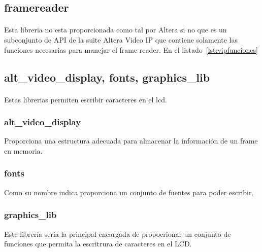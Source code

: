 \documentclass[a4paper,12pt,titlepage,final]{book}
\begin{document}






\subsection{framereader}
\paragraph{}
Esta libreria no esta proporcionada como tal por Altera si no que es un subconjunto de API de la suite Altera Video IP que contiene solamente las funciones necesarias para manejar el frame reader. En el listado~\ref{lst:vipfunciones}



\subsection{alt\_video\_display, fonts, graphics\_lib}
\paragraph{}
Estas librerias permiten escribir caracteres en el lcd. 

\subsubsection{alt\_video\_display}
Proporciona una estructura adecuada para almacenar la información de un frame en memoria.

\subsubsection{fonts}
Como su nombre indica proporciona un conjunto de fuentes para poder escribir.

\subsubsection{graphics\_lib}
Este librería seria la principal encargada de propocrionar un conjunto de funciones que permita la escritrura de caracteres en el LCD.
\end{document}
